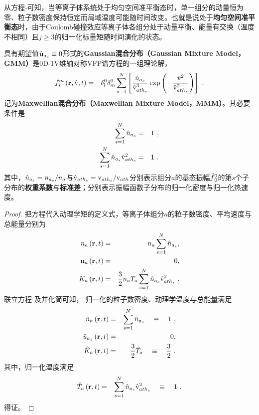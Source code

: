   从方程-可知，当等离子体系统处于均匀空间准平衡态时，单一组分的动量恒为零、粒子数密度保持恒定而局域温度可能随时间改变。也就是说处于\textbf{均匀空间准平衡态}时，由于Coulomb碰撞效应等离子体各组分处于动量平衡、能量有交换（温度不相同）且$j\ge3$的归一化标量矩随时间演化的状态。
  \begin{proposition} \label{定理-VFP的解3D1V-Maxwellian混合分布}
      具有期望值$\hat{\mathbf{u}}_{a_s} \equiv 0$形式的\textbf{Gaussian混合分布（Gaussian Mixture Model，GMM）}是0D-1V维轴对称VFP谱方程的一组理论解，
      \begin{eqnarray}
        \hat{f}{_{l}^m} \left(\mathbf{r},\hat{\mathrm{v}},t \right)  &=& \delta_l^0 \delta_m^0 \sum_{s=1}^{N} \left[ \frac{\hat{n}_{a_s}}{\hat{\mathrm{v}}_{{ath}_s}^3} \exp{\left(-\frac{\hat{\mathrm{v}}^2}{\hat{\mathrm{v}}_{{ath}_s}^2} \right)} \right] ~.  \label{fhofhos}
      \end{eqnarray}
      记为\textbf{Maxwellian混合分布（Maxwellian Mixture Model，MMM）}。其必要条件是
      \begin{eqnarray}
        \sum_{s=1}^{N} \hat{n}_{a_s} &=& 1 ~, \label{nhas0}
        \\
        \sum_{s=1}^{N} \hat{n}_{a_s} \hat{\mathrm{v}}_{{ath}_s}^2 &=& 1 ~. \label{Thas0}
      \end{eqnarray}
      其中，$\hat{n}_{a_s}=n_{a_s} / n_a$与$\hat{\mathrm{v}}_{{ath}_s} = {\mathrm{v}}_{{ath}_s} / \mathrm{v}_{ath}$分别表示组分$a$的基态振幅$\hat{f}{_0^0}$的第$s$个子分布的\textbf{权重系数}与\textbf{标准差}；分别表示振幅函数子分布的归一化密度与归一化热速度。
  \end{proposition}

  \begin{proof}
      把方程代入动理学矩的定义式，等离子体组分$a$的粒子数密度、平均速度与总能量分别为
      \begin{eqnarray}
        n_a \left(\mathbf{r},t \right) &=& n_a \sum_{s=1}^{N} \hat{n}_{a_s} , \label{nas}
        \\
        \mathbf{u}_a \left(\mathbf{r},t \right) &=& 0 , \label{uas}
        \\
        K_a \left(\mathbf{r},t \right) &=& \frac{3}{2} n_a T_a \sum_{s=1}^{N} \hat{n}_{a_s} \hat{\mathrm{v}}_{{ath}_s}^2~. \label{Kas}
      \end{eqnarray}
      联立方程-及并化简可知， 归一化的粒子数密度、动理学温度与总能量满足
      \begin{eqnarray}
        \hat{n}_a \left(\mathbf{r},t \right) &=& \sum_{s=1}^{N} \hat{n}_{a_s} \quad \equiv \quad 1 ~, \label{nhas}
        \\
        {\hat{u}}_{a_z} \left(\mathbf{r},t \right) &=& 0 , \label{uhazs}
        \\
        \hat{K}_a \left(\mathbf{r},t \right) & =   &  \frac{3}{2} \hat{T}_a \quad \equiv  \quad  \frac{3}{2} ~. \label{Khas}
      \end{eqnarray}
      其中，归一化温度满足
      \begin{eqnarray}
        \hat{T}_a \left(\mathbf{r},t \right) &=& \sum_{s=1}^{N} \hat{n}_{a_s} \hat{\mathrm{v}}_{{ath}_s}^2 \quad \equiv \quad 1 ~. \label{Thas}
      \end{eqnarray}
      得证。
  \end{proof}

